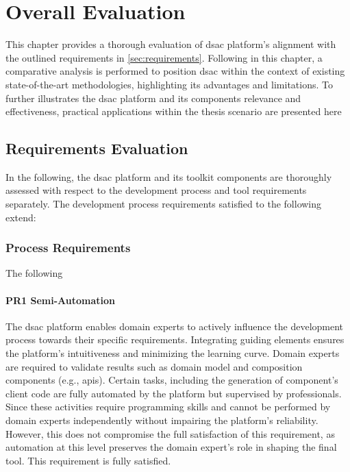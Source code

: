 \hypertarget{sec:evaluation}{%
\chapter{Overall Evaluation}\label{sec:evaluation}}

This chapter provides a thorough evaluation of \gls{dsac} platform’s alignment with the outlined requirements in \cref{sec:requirements}. Following in this chapter, a comparative analysis is performed to position \gls{dsac} within the context of existing state-of-the-art methodologies, highlighting its advantages and limitations. To further illustrates the \gls{dsac} platform and its components relevance and effectiveness, practical applications within the thesis scenario are presented here

\vspace{-15pt}
\hypertarget{requirements-evaluation}{%
\section{Requirements Evaluation}\label{requirements-evaluation}}
\vspace{15pt}
In the following, the \gls{dsac} platform and its toolkit components are thoroughly assessed with respect to the development process and tool requirements separately.
The development process requirements satisfied to the following extend:


\vspace{-10pt}
\hypertarget{sec:evaluation.scope-requirements}{%
\subsection{Process Requirements}\label{sec:evaluation.scope-requirements}}
\vspace{10pt}
The following

\subsubsection*{PR1 Semi-Automation}
The \gls{dsac} platform enables domain experts to actively influence the development process towards their specific requirements. Integrating guiding elements ensures the platform’s intuitiveness and minimizing the learning curve. Domain experts are required to validate results such as domain model and composition components (e.g., \gls{api}s). Certain tasks, including the generation of component’s client code are fully automated by the platform but supervised by professionals. Since these activities require programming skills and cannot be performed by domain experts independently without impairing the platform’s reliability. However, this does not compromise the full satisfaction of this requirement, as automation at this level preserves the domain expert’s role in shaping the final tool. This requirement is fully satisfied.

